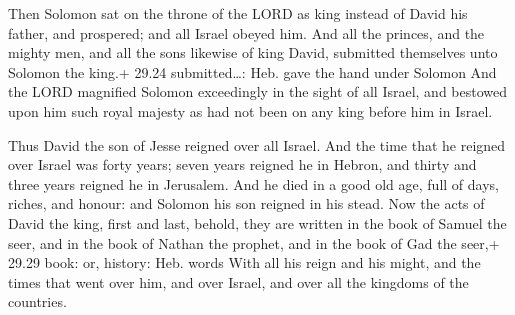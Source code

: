  Then Solomon sat on the throne of the LORD as king instead
of David his father, and prospered; and all Israel obeyed him.
 And all the princes, and the mighty men, and all the sons
likewise of king David, submitted themselves unto Solomon the king.+
29.24 submitted\ldots: Heb. gave the hand under Solomon 
And the LORD magnified Solomon exceedingly in the sight of all Israel,
and bestowed upon him such royal majesty as had not been on any king
before him in Israel.

 Thus David the son of Jesse reigned over all Israel.
 And the time that he reigned over Israel was forty years;
seven years reigned he in Hebron, and thirty and three years reigned he
in Jerusalem.  And he died in a good old age, full of days,
riches, and honour: and Solomon his son reigned in his stead.
 Now the acts of David the king, first and last, behold,
they are written in the book of Samuel the seer, and in the book of
Nathan the prophet, and in the book of Gad the seer,+ 29.29 book: or,
history: Heb. words  With all his reign and his might, and
the times that went over him, and over Israel, and over all the kingdoms
of the countries.
